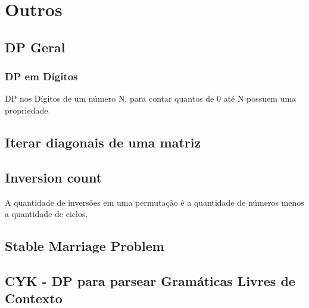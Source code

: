 \section{Outros}

\subsection{DP Geral}
\subsubsection{DP em D\'{i}gitos}
DP nos D\'{i}gitos de um n\'{u}mero N, para contar quantos de 0 at\'{e} N possuem uma propriedade.

\divisor

\subsection{Iterar diagonais de uma matriz}
\divisor

\subsection{Inversion count}
A quantidade de invers\~{o}es em uma permuta\c{c}\~{a}o \'{e} a quantidade de n\'{u}meros menos a quantidade de ciclos.

\divisor

\subsection{Stable Marriage Problem}

\divisor

\subsection{CYK - DP para parsear Gram\'{a}ticas Livres de Contexto}

